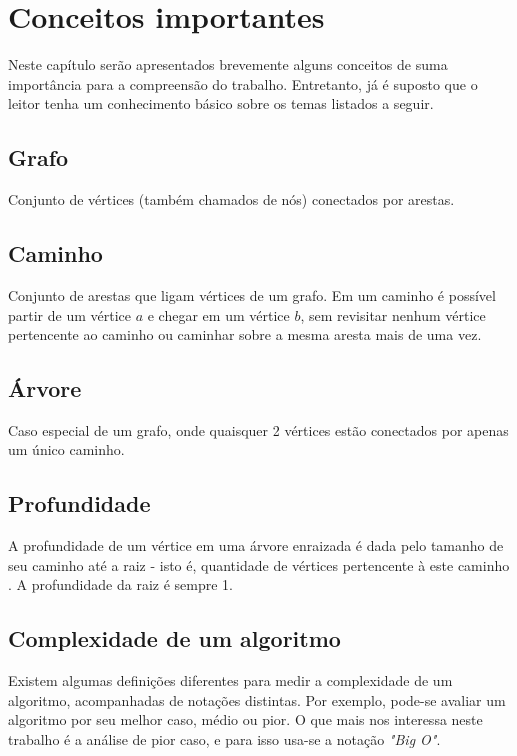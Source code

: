 \chapter{Conceitos importantes}
\label{cap:conceitos-importantes}

Neste capítulo serão apresentados brevemente alguns conceitos de suma importância 
para a compreensão do trabalho. Entretanto, já é suposto que o leitor tenha um 
conhecimento básico sobre os temas listados a seguir.

\section{Grafo}

Conjunto de vértices (também chamados de nós) conectados por arestas.

\section{Caminho}

Conjunto de arestas que ligam vértices de um grafo. Em um caminho é possível 
partir de um vértice $a$ e chegar em um vértice $b$, sem revisitar nenhum 
vértice pertencente ao caminho ou caminhar sobre a mesma aresta mais de uma vez.

\section{Árvore}

Caso especial de um grafo, onde quaisquer 2 vértices estão conectados por apenas 
um único caminho.

\section{Profundidade} 

A profundidade de um vértice em uma árvore enraizada é dada pelo tamanho de seu caminho
até a raiz - isto é, quantidade de vértices pertencente à este caminho . A profundidade da raiz é sempre 1.

\section{Complexidade de um algoritmo}

Existem algumas definições diferentes para medir a complexidade de um 
algoritmo, acompanhadas de notações distintas. Por exemplo, pode-se avaliar um 
algoritmo por seu melhor caso, médio ou pior. O que mais nos interessa neste 
trabalho é a análise de pior caso, e para isso usa-se a notação \emph{"Big O"}.

